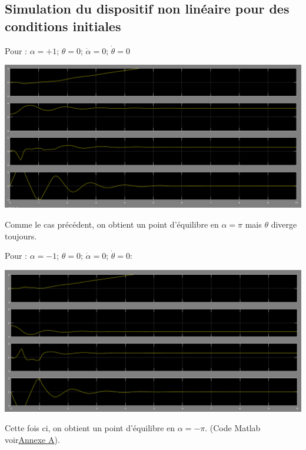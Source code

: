\documentclass[12pt, a4paper, openany]{report}
\begin{document}
\subsection{Simulation du dispositif non linéaire pour des conditions initiales}

Pour : $\alpha=+1$; $\theta=0$; $\dot{\alpha}=0$; $\dot{\theta} = 0$ \\
                                                   
\begin{center}
\includegraphics[scale=0.4]{alpha=+1.PNG}
\label{fig5} 
\end{center} 
Comme le cas précédent, on obtient un point d'équilibre en $ \alpha = \pi$ mais $\theta $ diverge toujours.  
 
Pour :
$\alpha=-1$; $\theta=0$; $\dot{\alpha}=0$; $\dot{\theta} = 0:$ \\
                                                   
\begin{center}
\includegraphics[scale=0.4]{alpha=-1.PNG}
\label{fig6} 
\end{center}
Cette fois ci, on obtient un point d'équilibre en $  \alpha = -\pi$. (Code Matlab voir\hyperref[section1.3]{Annexe A})\label{annexe1}.\\
\end{document}
